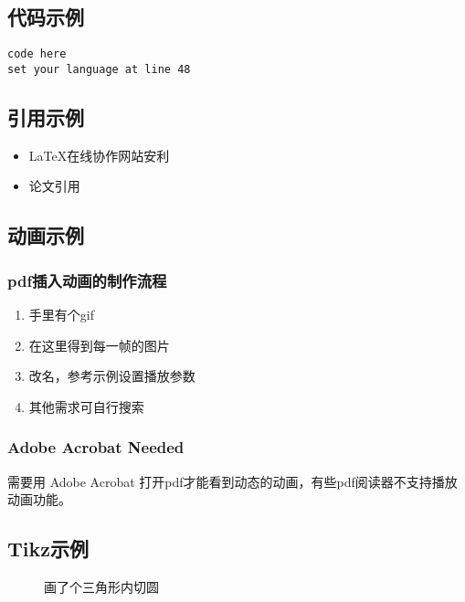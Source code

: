 \documentclass{article}
\begin{document}
\subsection{代码示例}
\begin{lstlisting}
code here
set your language at line 48

\end{lstlisting}

\subsection{引用示例}
\begin{itemize}
 \item  LaTeX在线协作网站安利\cite{overleaf}
 \item  论文引用\cite{six-directional}

\end{itemize}

\subsection{动画示例}
\subsubsection{pdf插入动画的制作流程}

\begin{enumerate}
\item 手里有个gif
\item 在这里\cite{iloveimg}得到每一帧的图片
\item 改名，参考示例设置播放参数
\item 其他需求可自行搜索
\end{enumerate}

\subsubsection{Adobe Acrobat Needed}
需要用 Adobe Acrobat 打开pdf才能看到动态的动画，有些pdf阅读器不支持播放动画功能。
\begin{figure}[H]
\centering
{}

\end{figure}


\subsection{Tikz示例}
\begin{figure}[H]
\centering
{}
\caption{画了个三角形内切圆}
\end{figure}
\end{document}
